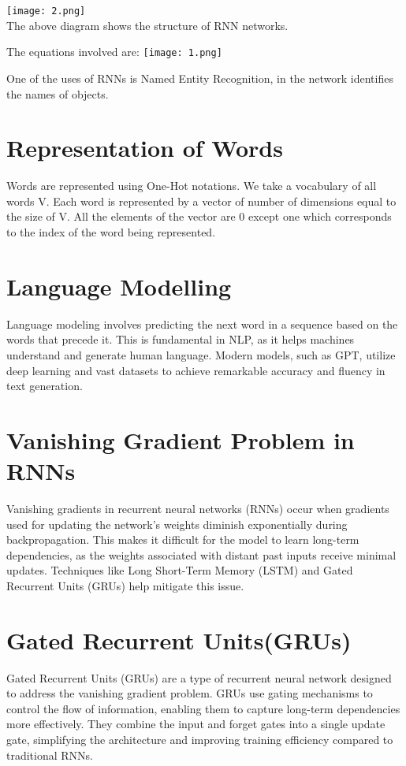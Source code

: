 \documentclass{article}
\begin{document}
\texttt{[image: 2.png]} \\
\vspace{.5cm}
The above diagram shows the structure of RNN networks.

\newpage
The equations involved are:
\texttt{[image: 1.png]}

One of the uses of RNNs is Named Entity Recognition, in the network identifies the names of objects.

\section{\Huge Representation of Words}
Words are represented using One-Hot notations. We take a vocabulary of all words V. Each word is represented by a vector of number of dimensions equal to the size of V. All the elements of the vector are 0 except one which corresponds to the index of the word being represented.

\section{\Huge Language Modelling}
Language modeling involves predicting the next word in a sequence based on the words that precede it. This is fundamental in NLP, as it helps machines understand and generate human language. Modern models, such as GPT, utilize deep learning and vast datasets to achieve remarkable accuracy and fluency in text generation.

\section{\Huge Vanishing Gradient Problem in RNNs}
Vanishing gradients in recurrent neural networks (RNNs) occur when gradients used for updating the network's weights diminish exponentially during backpropagation. This makes it difficult for the model to learn long-term dependencies, as the weights associated with distant past inputs receive minimal updates. Techniques like Long Short-Term Memory (LSTM) and Gated Recurrent Units (GRUs) help mitigate this issue.

\section{\Huge Gated Recurrent Units(GRUs)}
Gated Recurrent Units (GRUs) are a type of recurrent neural network designed to address the vanishing gradient problem. GRUs use gating mechanisms to control the flow of information, enabling them to capture long-term dependencies more effectively. They combine the input and forget gates into a single update gate, simplifying the architecture and improving training efficiency compared to traditional RNNs.
\end{document}

